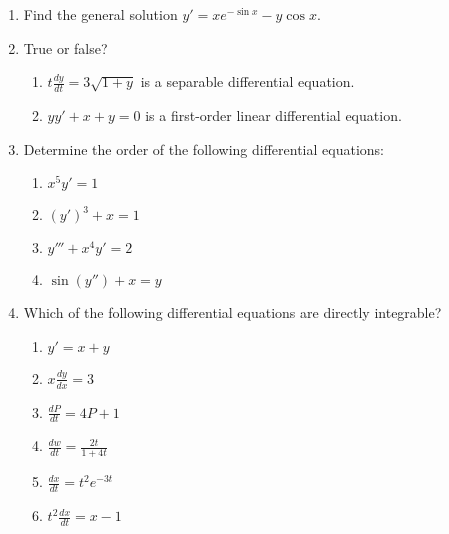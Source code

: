 \documentclass{nosvagor-notes}
\begin{document}
\begin{enumerate}
  \item Find the general solution \(y' = xe^{-\sin x} - y \cos x\).


  \newpage

  \item True or false?
  \begin{enumerate}
    \item \(t \frac{dy}{dt} = 3\sqrt{1+y} \) is a separable differential
      equation.
    \vspace{80pt}
    \item \(yy' + x + y = 0\) is a first-order linear differential equation.
    \vspace{80pt}
  \end{enumerate}

  \item Determine the order of the following differential equations:
    \begin{multicols}{2}
      \begin{enumerate}
        \item \(x^5y'=1\)
        \item \((y')^3+x=1\)
        \item \(y''' + x^4y' = 2\)
        \item \(\sin (y'') + x = y\)
      \end{enumerate}
    \end{multicols}
    \vspace{80pt}

  \item Which of the following differential equations are directly integrable?
  \begin{multicols}{2}
    \begin{enumerate}
      \item \(y'=x+y\)
      \item \(x \frac{dy}{dx} = 3\)
      \item \(\frac{dP}{dt} = 4P + 1\)
      \item \(\frac{dw}{dt} = \frac{2t}{1+4t}\)
      \item \(\frac{dx}{dt} = t^2 e^{-3t}\)
      \item \(t^2 \frac{dx}{dt} = x - 1\)
    \end{enumerate}
  \end{multicols}

  \newpage


\end{enumerate}
\end{document}
